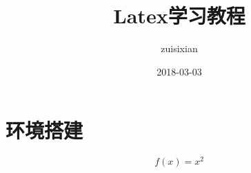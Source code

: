 \documentclass{article}
\title{Latex学习教程}
\date{2018-03-03}
\author{zuisixian}
\begin{document}
\maketitle
\section{环境搭建}
  \begin{equation}
    f(x) = x^2
  \end{equation}
\end{document}

